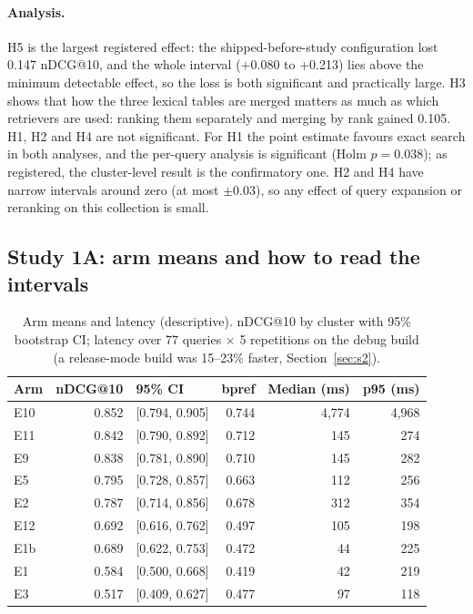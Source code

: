 \documentclass[11pt,a4paper]{article}
\makeatletter
\newcommand{\ndcg}{nDCG@10}
\makeatother
\begin{document}
\paragraph{Analysis.} H5 is the largest registered effect: the shipped-before-study configuration lost 0.147 \ndcg{}, and the whole interval (+0.080 to +0.213) lies above the minimum detectable effect, so the loss is both significant and practically large. H3 shows that how the three lexical tables are merged matters as much as which retrievers are used: ranking them separately and merging by rank gained 0.105. H1, H2 and H4 are not significant. For H1 the point estimate favours exact search in both analyses, and the per-query analysis is significant (Holm $p=0.038$); as registered, the cluster-level result is the confirmatory one. H2 and H4 have narrow intervals around zero (at most $\pm$0.03), so any effect of query expansion or reranking on this collection is small.

\subsection{Study 1A: arm means and how to read the intervals}

\begin{table}[tbp]
\centering\small
\caption{Arm means and latency (descriptive). \ndcg{} by cluster with 95\% bootstrap CI; latency over 77 queries $\times$ 5 repetitions on the debug build (a release-mode build was 15--23\% faster, Section~\ref{sec:s2}).}
\label{tab:armmeans}
\begin{tabular}{lrlrrr}
\toprule
Arm & \ndcg{} & 95\% CI & bpref & Median (ms) & p95 (ms) \\
\midrule
E10 & 0.852 & [0.794, 0.905] & 0.744 & 4,774 & 4,968 \\
E11 & 0.842 & [0.790, 0.892] & 0.712 & 145 & 274 \\
\rowcolor{blue!6} E9 & 0.838 & [0.781, 0.890] & 0.710 & 145 & 282 \\
E5 & 0.795 & [0.728, 0.857] & 0.663 & 112 & 256 \\
E2 & 0.787 & [0.714, 0.856] & 0.678 & 312 & 354 \\
E12 & 0.692 & [0.616, 0.762] & 0.497 & 105 & 198 \\
E1b & 0.689 & [0.622, 0.753] & 0.472 & 44 & 225 \\
E1 & 0.584 & [0.500, 0.668] & 0.419 & 42 & 219 \\
E3 & 0.517 & [0.409, 0.627] & 0.477 & 97 & 118 \\
\bottomrule
\end{tabular}
\end{table}
\end{document}
